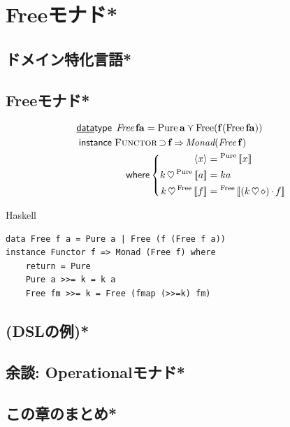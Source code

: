 \documentclass[a5paper,twoside,fleqn,draft]{jsbook}
\def\[{\left[\!\left[}
\def\]{\right]\!\right]}
\newcommand{\programminglanguage}[1]{\textsf{#1}}
\newcommand{\haskell}{\programminglanguage{Haskell}}
\newenvironment{haskellcode}{\begin{itembox}[r]{\haskell}}{\end{itembox}}
\newcommand{\mKeyword}[1]{\mathsf{#1}} %
\newcommand{\mKeywordUnderline}[1]{\text{\underline{\textsf{#1}}}} %
\newcommand{\mDataTypeKeyword}{\mKeywordUnderline{data}\mKeyword{type}}
\newcommand{\mInstanceKeyword}{\mKeyword{instance}}
\newcommand{\mWhereKeyword}{\mKeyword{where}}
\DeclareMathOperator{\mDataType}{\mDataTypeKeyword}
\DeclareMathOperator{\mInstance}{\mInstanceKeyword}
\DeclareMathOperator{\mSuperClass}{\Rightarrow}
\DeclareMathOperator{\mSuperSet}{\supset}
\DeclareMathOperator{\mWhere}{\mWhereKeyword}
\newcommand{\mAnonParam}{\diamond}
\DeclareMathOperator{\mBind}{\heartsuit}
\DeclareMathOperator{\mMap}{\cdot} %
\DeclareMathOperator{\mValueOr}{\curlyvee}
\newcommand{\mType}[1]{\mathbf{#1}}
\newcommand{\mTypeConstructor}[1]{\textit{#1}}
\newcommand{\mValueConstructor}[1]{\mathrm{#1}}
\newcommand{\mGenericValueAssemble}[2]{{}^\mValueConstructor{#1}\[#2\]}
\newcommand{\mPureWith}[1]{\langle#1\rangle}
\newcommand{\mGenericTypeClass}[1]{\textsc{#1}} %
\newcommand{\mFunctorTypeClass}{\mGenericTypeClass{Functor}}
\begin{document}

\chapter{Freeモナド*}
\section{ドメイン特化言語*}
\section{Freeモナド*}
\begin{align}
\mDataType\;&\mathop{\mTypeConstructor{Free}}\mType{f}\mType{a}=\mathop{\mValueConstructor{Pure}}\mType{a}\mValueOr\mathop{\mValueConstructor{Free}(\mType{f}(\mathop{\mValueConstructor{Free}}\mType{f}\mType{a}))}\\
\mInstance\;&\mFunctorTypeClass\mSuperSet\mType{f}\mSuperClass\mTypeConstructor{Monad}(\mathop{\mTypeConstructor{Free}}\mType{f})\nonumber\\
&\quad\mWhere\left\{
\begin{aligned}
\mPureWith{x}&=\mGenericValueAssemble{Pure}{x}\\
k\mBind\mGenericValueAssemble{Pure}{a}&=ka\\
k\mBind\mGenericValueAssemble{Free}{f}&=\mGenericValueAssemble{Free}{(k\mBind\mAnonParam)\mMap f}
\end{aligned}
\right.
\end{align}

\begin{haskellcode}
\begin{verbatim}
data Free f a = Pure a | Free (f (Free f a))
instance Functor f => Monad (Free f) where
    return = Pure
    Pure a >>= k = k a
    Free fm >>= k = Free (fmap (>>=k) fm)
\end{verbatim}
\end{haskellcode}

\section{(DSLの例)*}
\section{余談: Operationalモナド*}
\section{この章のまとめ*}
\end{document}
